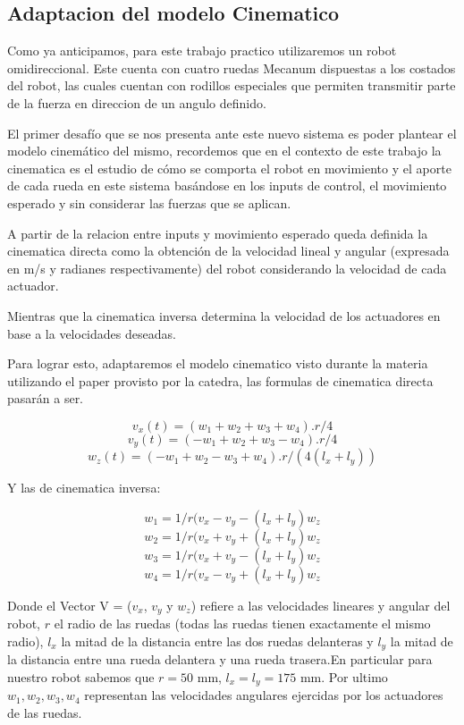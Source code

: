 \subsection{Adaptacion del modelo Cinematico}
Como ya anticipamos, para este trabajo practico utilizaremos un robot omidireccional. Este cuenta con cuatro ruedas Mecanum dispuestas a los costados del robot, las cuales cuentan con rodillos especiales que permiten transmitir parte de la fuerza en direccion de un angulo definido.  %


El primer desafío que se nos presenta ante este nuevo sistema es poder plantear el modelo cinemático del mismo, recordemos que en el contexto de este trabajo la cinematica es el estudio de cómo se comporta el robot en movimiento y el aporte de cada rueda en este sistema basándose en los inputs de control, el movimiento esperado y sin considerar las fuerzas que se aplican.

A partir de la relacion entre inputs y movimiento esperado queda definida la cinematica directa como la obtención de la velocidad lineal y angular (expresada en m/s y radianes respectivamente) del robot considerando la velocidad de cada actuador.

Mientras que la cinematica inversa determina la velocidad de los actuadores en base a la velocidades deseadas.


Para lograr esto, adaptaremos el modelo cinematico visto durante la materia utilizando el paper provisto por la catedra, las formulas de cinematica directa pasarán a ser.

$$v_x(t)=(w_1+w_2+w_3+w_4).r/4$$
$$v_y(t)=(-w_1+w_2+w_3-w_4).r/4$$
$$w_z(t)=(-w_1+w_2-w_3+w_4).r/(4(l_x+l_y))$$


Y las de cinematica inversa:

$$ w_1 = 1/r (v_x - v_y - (l_x + l_y)w_z$$
$$ w_2 = 1/r (v_x + v_y + (l_x + l_y)w_z$$
$$ w_3 = 1/r (v_x + v_y - (l_x + l_y)w_z$$
$$ w_4 = 1/r (v_x - v_y + (l_x + l_y)w_z$$

Donde el Vector V = ($v_x$, $v_y$ y $w_z$) refiere a las velocidades lineares y angular del robot, $r$ el radio de las ruedas (todas las ruedas tienen exactamente el mismo radio), $l_x$ la mitad de la distancia entre las dos ruedas delanteras y $l_y$ la mitad de la distancia entre una rueda delantera y una rueda trasera.En particular para nuestro robot sabemos que $r =50 $ mm, $l_x = l_y = 175 $ mm. Por ultimo $w_1,w_2,w_3,w_4$ representan las velocidades angulares ejercidas por los actuadores de las ruedas.

